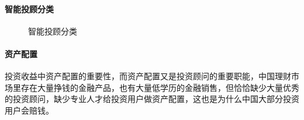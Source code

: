 \documentclass[letterpaper,10pt,english]{sphinxmanual}
\begin{document}
\paragraph{智能投顾分类}
\label{\detokenize{chapter_AI+Finance/Robo-Advisor:id5}}
\begin{figure}[H]
\centering
\capstart

\noindent{}
\caption{智能投顾分类\sphinxfootnotemark[1108]}\label{\detokenize{chapter_AI+Finance/Robo-Advisor:id9}}\end{figure}
%
\begin{footnotetext}[1108]\sphinxAtStartFootnote
{}
%
\end{footnotetext}\ignorespaces 

\paragraph{资产配置}
\label{\detokenize{chapter_AI+Finance/Robo-Advisor:id6}}
投资收益中资产配置的重要性，而资产配置又是投资顾问的重要职能，中国理财市场里存在大量挣钱的金融产品，也有大量低学历的金融销售，但恰恰缺少大量优秀的投资顾问，缺少专业人才给投资用户做资产配置，这也是为什么中国大部分投资用户会赔钱。
%
\begin{footnote}[1109]\sphinxAtStartFootnote
{}
%
\end{footnote}
\end{document}
